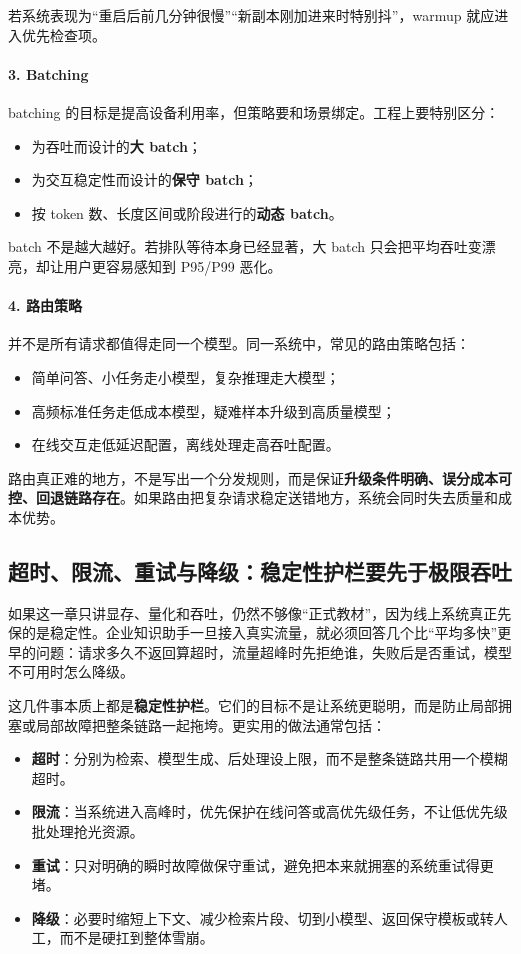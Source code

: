 若系统表现为“重启后前几分钟很慢”“新副本刚加进来时特别抖”，warmup 就应进入优先检查项。

\paragraph{3. Batching}
batching 的目标是提高设备利用率，但策略要和场景绑定。工程上要特别区分：
\begin{itemize}
  \item 为吞吐而设计的\textbf{大 batch}；
  \item 为交互稳定性而设计的\textbf{保守 batch}；
  \item 按 token 数、长度区间或阶段进行的\textbf{动态 batch}。
\end{itemize}

batch 不是越大越好。若排队等待本身已经显著，大 batch 只会把平均吞吐变漂亮，却让用户更容易感知到 P95/P99 恶化。

\paragraph{4. 路由策略}
并不是所有请求都值得走同一个模型。同一系统中，常见的路由策略包括：
\begin{itemize}
  \item 简单问答、小任务走小模型，复杂推理走大模型；
  \item 高频标准任务走低成本模型，疑难样本升级到高质量模型；
  \item 在线交互走低延迟配置，离线处理走高吞吐配置。
\end{itemize}

路由真正难的地方，不是写出一个分发规则，而是保证\textbf{升级条件明确、误分成本可控、回退链路存在}。如果路由把复杂请求稳定送错地方，系统会同时失去质量和成本优势。

\subsection{超时、限流、重试与降级：稳定性护栏要先于极限吞吐}
如果这一章只讲显存、量化和吞吐，仍然不够像“正式教材”，因为线上系统真正先保的是稳定性。企业知识助手一旦接入真实流量，就必须回答几个比“平均多快”更早的问题：请求多久不返回算超时，流量超峰时先拒绝谁，失败后是否重试，模型不可用时怎么降级。

这几件事本质上都是\textbf{稳定性护栏}。它们的目标不是让系统更聪明，而是防止局部拥塞或局部故障把整条链路一起拖垮。更实用的做法通常包括：
\begin{itemize}
  \item \textbf{超时}：分别为检索、模型生成、后处理设上限，而不是整条链路共用一个模糊超时。
  \item \textbf{限流}：当系统进入高峰时，优先保护在线问答或高优先级任务，不让低优先级批处理抢光资源。
  \item \textbf{重试}：只对明确的瞬时故障做保守重试，避免把本来就拥塞的系统重试得更堵。
  \item \textbf{降级}：必要时缩短上下文、减少检索片段、切到小模型、返回保守模板或转人工，而不是硬扛到整体雪崩。
\end{itemize}

